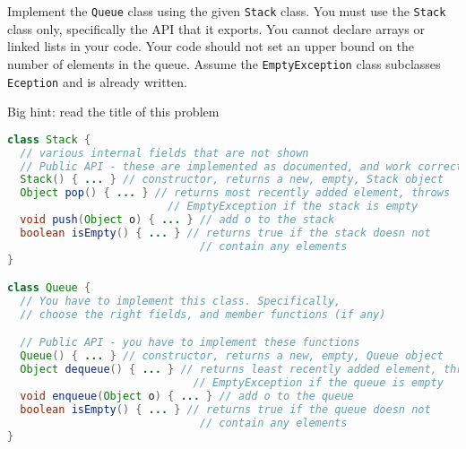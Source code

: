 \documentclass[11pt]{exam}
\begin{document}
\begin{questions}


Implement the {\tt Queue} class using the given {\tt Stack} class.
You must use the {\tt Stack} class only, specifically
the API that it exports. You cannot declare arrays
or linked lists in your code. Your code should not set
an upper bound on the number of elements in the queue.
Assume the {\tt EmptyException} class subclasses {\tt Eception}
and is already written.

Big hint: read the title of this problem

\begin{lstlisting}[language=Java]
class Stack {
  // various internal fields that are not shown
  // Public API - these are implemented as documented, and work correctly
  Stack() { ... } // constructor, returns a new, empty, Stack object
  Object pop() { ... } // returns most recently added element, throws
                         // EmptyException if the stack is empty
  void push(Object o) { ... } // add o to the stack
  boolean isEmpty() { ... } // returns true if the stack doesn not
                              // contain any elements
}

class Queue {
  // You have to implement this class. Specifically,
  // choose the right fields, and member functions (if any)

  // Public API - you have to implement these functions
  Queue() { ... } // constructor, returns a new, empty, Queue object
  Object dequeue() { ... } // returns least recently added element, throws
                             // EmptyException if the queue is empty
  void enqueue(Object o) { ... } // add o to the queue
  boolean isEmpty() { ... } // returns true if the queue doesn not
                              // contain any elements
}
\end{lstlisting}






\end{questions}
\end{document}
